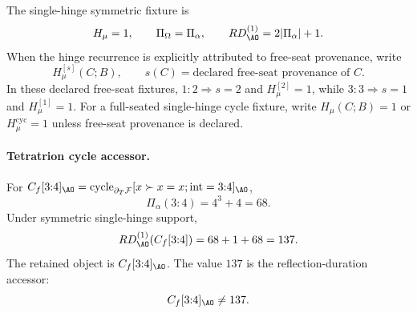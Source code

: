 The single-hinge symmetric fixture is
\begin{equation}
H_\mu=1,
\qquad
\Pi_\Omega=\Pi_\alpha,
\qquad
RD^{(1)}_{\AO}=2|\Pi_\alpha|+1.
\label{eq:single-hinge-symmetric-fixture}
\end{equation}
When the hinge recurrence is explicitly attributed to free-seat provenance, write
\begin{equation}
H_\mu^{[s]}(C;B),
\qquad
s(C)=\text{declared free-seat provenance of }C.
\label{eq:free-seat-hinge-provenance}
\end{equation}
In these declared free-seat fixtures, \(1{:}2\Rightarrow s=2\) and \(H_\mu^{[2]}=1\), while \(3{:}3\Rightarrow s=1\) and \(H_\mu^{[1]}=1\). For a full-seated single-hinge cycle fixture, write \(H_\mu(C;B)=1\) or \(H_\mu^{\mathrm{cyc}}=1\) unless free-seat provenance is declared.

\paragraph{Tetratrion cycle accessor.}
For \(C_f[3{:}4]_{\AO}=\operatorname{cycle}_{\partial_T\mathcal F}[x\succ x=x;\operatorname{int}=3{:}4]_{\AO}\),
\[
\Pi_\alpha(3{:}4)=4^3+4=68.
\]
Under symmetric single-hinge support,
\[
RD^{(1)}_{\AO}\!\left(C_f[3{:}4]\right)=68+1+68=137.
\]
The retained object is \(C_f[3{:}4]_{\AO}\). The value \(137\) is the reflection-duration accessor:
\[
C_f[3{:}4]_{\AO}\ne 137.
\]


